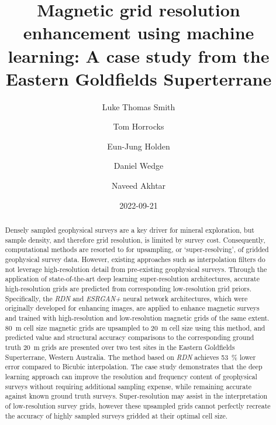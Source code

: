 % 
% 

\title{Magnetic grid resolution enhancement using machine learning: A case study from the Eastern Goldfields Superterrane}
\author[1*]{Luke Thomas Smith}
\author[1]{Tom Horrocks}
\author[1]{Eun-Jung Holden}
\author[1]{Daniel Wedge}
\author[2]{Naveed Akhtar}
\date{2022-09-21}

\bigskip
\begin{abstract}
    Densely sampled geophysical surveys are a key driver for mineral exploration, but sample density, and therefore grid resolution, is limited by survey cost.
    Consequently, computational methods are resorted to for upsampling, or `super-resolving', of gridded geophysical survey data.
    However, existing approaches such as interpolation filters do not leverage high-resolution detail from pre-existing geophysical surveys.
    Through the application of state-of-the-art deep learning super-resolution architectures, accurate high-resolution grids are predicted from corresponding low-resolution grid priors.
    Specifically, the \emph{RDN} and \emph{ESRGAN+} neural network architectures, which were originally developed for enhancing images, are applied to enhance magnetic surveys and trained with high-resolution and low-resolution magnetic grids of the same extent.
    \qty{80}{\metre} cell size magnetic grids are upsampled to \qty{20}{\metre} cell size using this method, and predicted value and structural accuracy comparisons to the corresponding ground truth \qty{20}{\metre} grids are presented over two test sites in the Eastern Goldfields Superterrane, Western Australia.
    The method based on \emph{RDN} achieves \qty{53}{\percent} lower error compared to Bicubic interpolation.
    The case study demonstrates that the deep learning approach can improve the resolution and frequency content of geophysical surveys without requiring additional sampling expense, while remaining accurate against known ground truth surveys.
    Super-resolution may assist in the interpretation of low-resolution survey grids, however these upsampled grids cannot perfectly recreate the accuracy of highly sampled surveys gridded at their optimal cell size.
\end{abstract}


